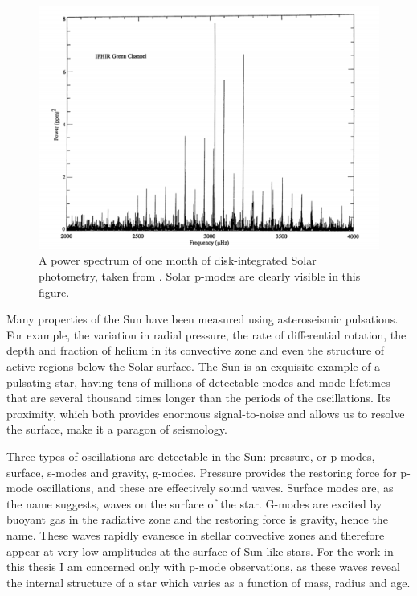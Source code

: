 \begin{figure}[p]
\begin{center}
\includegraphics[width=6in, clip=true]{figures/solar_spectrum.pdf}
\caption{A power spectrum of one month of disk-integrated Solar photometry,
taken from \citet{toutain}. Solar p-modes are clearly visible in this figure.}
\label{fig:solar_spectrum}
\end{center}
\end{figure}

Many properties of the Sun have been measured using asteroseismic pulsations.
For example, the variation in radial pressure, the rate of differential
rotation, the depth and fraction of helium in its convective zone and even the
structure of active regions below the Solar surface.
The Sun is an exquisite example of a pulsating star, having tens of millions
of detectable modes and mode lifetimes that are several thousand times longer
than the periods of the oscillations.
Its proximity, which both provides enormous signal-to-noise and allows us to
resolve the surface, make it a paragon of seismology.

Three types of oscillations are detectable in the Sun: pressure, or p-modes,
surface, s-modes and gravity, g-modes.
Pressure provides the restoring force for p-mode oscillations, and these are
effectively sound waves.
Surface modes are, as the name suggests, waves on the surface of the star.
G-modes are excited by buoyant gas in the radiative zone and the restoring
force is gravity, hence the name.
These waves rapidly evanesce in stellar convective zones and therefore
appear at very low amplitudes at the surface of Sun-like stars.
For the work in this thesis I am concerned only with p-mode observations, as
these waves reveal the internal structure of a star which varies as a function
of mass, radius and age.

